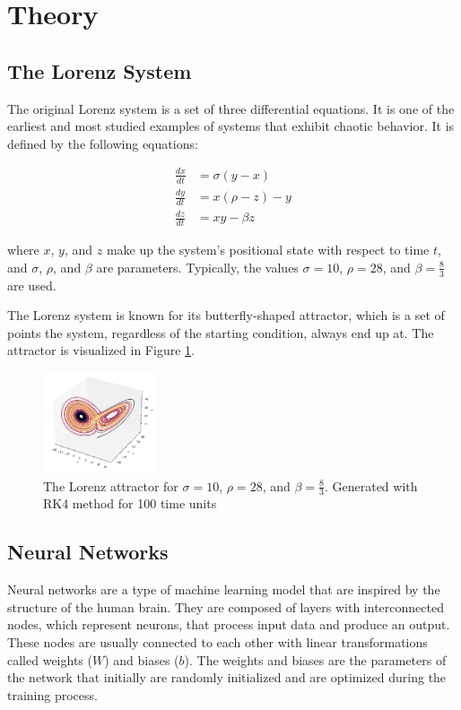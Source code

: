 \documentclass[11pt]{article}
\begin{document}
\section{Theory}

\subsection{The Lorenz System}

The original Lorenz system is a set of three differential equations. It is one of the earliest and most studied examples of systems that exhibit chaotic behavior. It is defined by the following equations:

\begin{align}
\frac{dx}{dt} &= \sigma(y - x) \\
\frac{dy}{dt} &= x(\rho - z) - y \\
\frac{dz}{dt} &= xy - \beta z
\end{align}

where $x$, $y$, and $z$ make up the system's positional state with respect to time $t$, and $\sigma$, $\rho$, and $\beta$ are parameters. Typically, the values $\sigma = 10$, $\rho = 28$, and $\beta = \frac{8}{3}$ are used.

The Lorenz system is known for its butterfly-shaped attractor, which is a set of points the system, regardless of the starting condition, always end up at. The attractor is visualized in Figure \ref{fig:lorenz_attractor}.

\begin{figure}[h]
\centering
\includegraphics[width=0.3\textwidth]{lorenz_attractor.jpeg}
\caption{The Lorenz attractor for $\sigma = 10$, $\rho = 28$, and $\beta = \frac{8}{3}$. Generated with RK4 method for 100 time units}
\label{fig:lorenz_attractor}
\end{figure}

\subsection{Neural Networks}

Neural networks are a type of machine learning model that are inspired by the structure of the human brain. They are composed of layers with interconnected nodes, which represent neurons, that process input data and produce an output. These nodes are usually connected to each other with linear transformations called weights (\(W\)) and biases (\(b\)). The weights and biases are the parameters of the network that initially are randomly initialized and are optimized during the training process. \\
\end{document}
